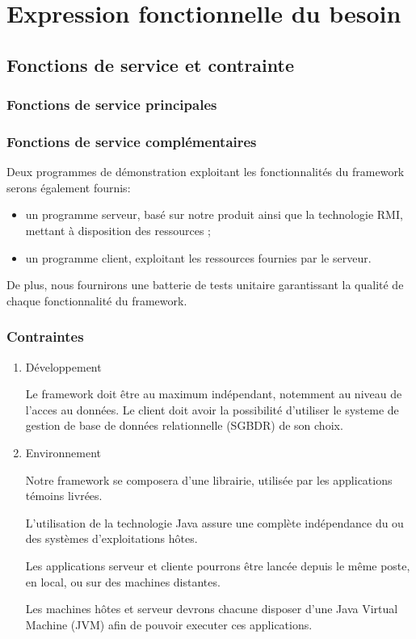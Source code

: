 \section{Expression fonctionnelle du besoin}

\subsection{Fonctions de service et contrainte}
\subsubsection{Fonctions de service principales}

\subsubsection{Fonctions de service complémentaires}
Deux programmes de démonstration exploitant les fonctionnalités du framework serons également
fournis:
\begin{itemize}
 \item un programme serveur, basé sur notre produit ainsi que la technologie RMI, mettant à disposition des ressources ;
 \item un programme client, exploitant les ressources fournies par le serveur. 
\end{itemize}

De plus, nous fournirons une batterie de tests unitaire garantissant la qualité de chaque fonctionnalité du framework.
\subsubsection{Contraintes}
\begin{enumerate}
 \item Développement

Le framework doit être au maximum indépendant, notemment au niveau de l'acces au données.
Le client doit avoir la possibilité d'utiliser le systeme de gestion de base de données relationnelle (SGBDR) de son choix.

 \item Environnement

Notre framework se composera d'une librairie, utilisée par les applications témoins livrées.

L'utilisation de la technologie Java assure une complète indépendance du ou des systèmes d'exploitations hôtes.

Les applications serveur et cliente pourrons être lancée depuis le même poste, en local, ou sur des machines distantes.

Les machines hôtes et serveur devrons chacune disposer d'une Java Virtual Machine (JVM) afin de pouvoir executer ces applications.

\end{enumerate}

